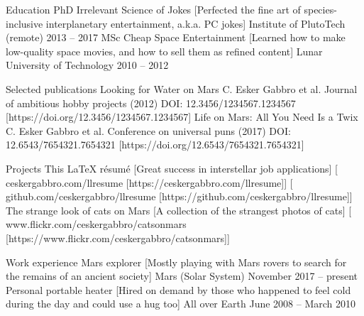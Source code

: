 \documentclass[
]{llresume}
\begin{document}
\makeheader

\begin{mainpane}
    \begin{mainsection}{Education}
        \entryJob
            {PhD Irrelevant Science of Jokes}
            [Perfected the fine art of species-inclusive interplanetary
            entertainment, a.k.a. PC jokes]
            {Institute of PlutoTech (remote)}
            {2013 -- 2017}
        \entryJob
            {MSc Cheap Space Entertainment}
            [Learned how to make low-quality space movies, and how to sell them
            as refined content]
            {Lunar University of Technology}
            {2010 -- 2012}
    \end{mainsection}

    \begin{mainsection}{Selected publications}
        \entryPub
            {Looking for Water on Mars}
            {C. Esker Gabbro et al.}
            {Journal of ambitious hobby projects (2012)}
            {DOI: 12.3456/1234567.1234567}
            [https://doi.org/12.3456/1234567.1234567]
        \entryPub
            {Life on Mars: All You Need Is a Twix}
            {C. Esker Gabbro et al.}
            {Conference on universal puns (2017)}
            {DOI: 12.6543/7654321.7654321}
            [https://doi.org/12.6543/7654321.7654321]
    \end{mainsection}

    \begin{mainsection}{Projects}
        \entryGeneric
            {This LaTeX r\'esum\'e}
            [Great success in interstellar job applications]
            [\infoHomepage
                {ceskergabbro.com/llresume}
                [https://ceskergabbro.com/llresume]]
            [\infoGithub
                {github.com/ceskergabbro/llresume}
                [https://github.com/ceskergabbro/llresume]]
        \entryGeneric
            {The strange look of cats on Mars}
            [A collection of the strangest photos of cats]
            [\infoFlickr
                {www.flickr.com/ceskergabbro/catsonmars}
                [https://www.flickr.com/ceskergabbro/catsonmars]]
    \end{mainsection}

    \begin{mainsection}{Work experience}
        \entryJob
            {Mars explorer}
            [Mostly playing with Mars rovers to search for the remains of an
            ancient society]
            {Mars (Solar System)}
            {November 2017 -- present}
        \entryJob
            {Personal portable heater}
            [Hired on demand by those who happened to feel cold during the
            day and could use a hug too]
            {All over Earth}
            {June 2008 -- March 2010}
    \end{mainsection}


\end{mainpane}
\end{document}
